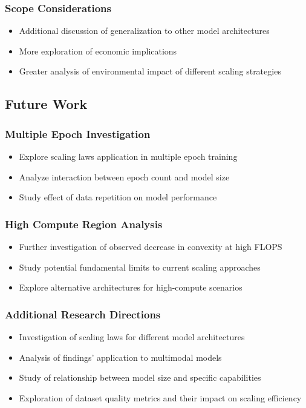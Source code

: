 \documentclass{article}
\begin{document}
\subsubsection{Scope Considerations}
\begin{itemize}
    \item Additional discussion of generalization to other model architectures
    \item More exploration of economic implications
    \item Greater analysis of environmental impact of different scaling strategies
\end{itemize}

\subsection{Future Work}
\subsubsection{Multiple Epoch Investigation}
\begin{itemize}
    \item Explore scaling laws application in multiple epoch training
    \item Analyze interaction between epoch count and model size
    \item Study effect of data repetition on model performance
\end{itemize}

\subsubsection{High Compute Region Analysis}
\begin{itemize}
    \item Further investigation of observed decrease in convexity at high FLOPS
    \item Study potential fundamental limits to current scaling approaches
    \item Explore alternative architectures for high-compute scenarios
\end{itemize}

\subsubsection{Additional Research Directions}
\begin{itemize}
    \item Investigation of scaling laws for different model architectures
    \item Analysis of findings' application to multimodal models
    \item Study of relationship between model size and specific capabilities
    \item Exploration of dataset quality metrics and their impact on scaling efficiency
\end{itemize}
\end{document}
